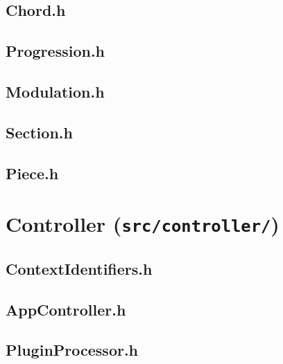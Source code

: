 \subsection{Chord.h}


\subsection{Progression.h}


\subsection{Modulation.h}


\subsection{Section.h}


\subsection{Piece.h}


\newpage
\section{Controller (\texttt{src/controller/})}

\subsection{ContextIdentifiers.h}


\subsection{AppController.h}


\subsection{PluginProcessor.h}


